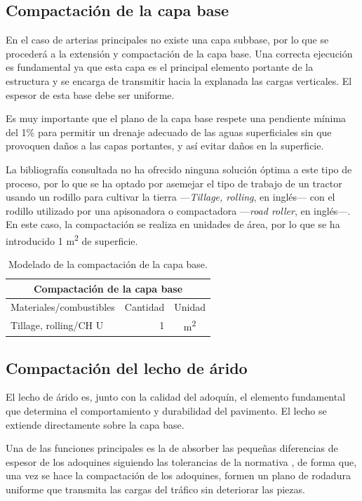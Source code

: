 \subsection{Compactación de la capa base}

En el caso de arterias principales no existe una capa subbase, por lo que se procederá a la extensión y compactación de la capa base. Una correcta ejecución es fundamental ya que esta capa es el principal elemento portante de la estructura y se encarga de transmitir hacia la explanada las cargas verticales. El espesor de esta base debe ser uniforme.

Es muy importante que el plano de la capa base respete una pendiente mínima del 1\% para permitir un drenaje adecuado de las aguas superficiales sin que provoquen daños a las capas portantes, y así evitar daños en la superficie.

La bibliografía consultada no ha ofrecido ninguna solución óptima a este tipo de proceso, por lo que se ha optado por asemejar el tipo de trabajo de un tractor usando un rodillo para cultivar la tierra —\textit{Tillage, rolling}, en inglés— con el rodillo utilizado por una apisonadora o compactadora —\textit{road roller}, en inglés—. En este caso, la compactación se realiza en unidades de área, por lo que se ha introducido 1 \si{m^2} de superficie.

\begin{table}[!htb]
\centering
\begin{tabular}{p{8cm}rc}
\toprule
\multicolumn{3}{c}{Compactación de la capa base}\\
\midrule
Materiales/combustibles & Cantidad & Unidad\\
\midrule
Tillage, rolling/CH U & 1 & \si{m^2}\\
\bottomrule
\end{tabular}
\caption{Modelado de la compactación de la capa base.}
\label{modeladocapabase}
\end{table}

\subsection{Compactación del lecho de árido}

El lecho de árido es, junto con la calidad del adoquín, el elemento fundamental que determina el comportamiento y durabilidad del pavimento. El lecho se extiende directamente sobre la capa base.

Una de las funciones principales es la de absorber las pequeñas diferencias de espesor de los adoquines siguiendo las tolerancias de la normativa \cite{une1338}, de forma que, una vez se hace la compactación de los adoquines, formen un plano de rodadura uniforme que transmita las cargas del tráfico sin deteriorar las piezas.

